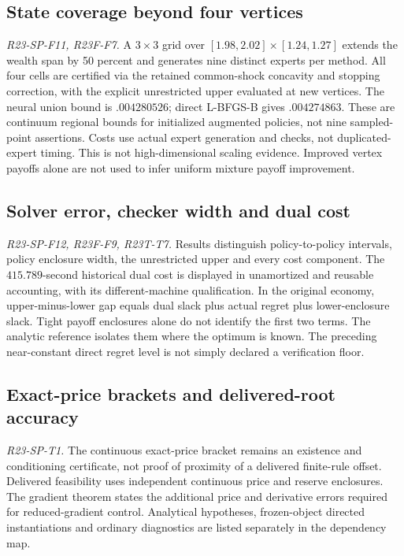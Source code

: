 \subsection{State coverage beyond four vertices}
\noindent\textit{R23-SP-F11, R23F-F7.}
A $3\times3$ grid over $[1.98,2.02]\times[1.24,1.27]$ extends the wealth span by 50 percent and generates nine distinct experts per method. All four cells are certified via the retained common-shock concavity and stopping correction, with the explicit unrestricted upper evaluated at new vertices. The neural union bound is $.004280526$; direct L-BFGS-B gives $.004274863$. These are continuum regional bounds for initialized augmented policies, not nine sampled-point assertions. Costs use actual expert generation and checks, not duplicated-expert timing. This is not high-dimensional scaling evidence. Improved vertex payoffs alone are not used to infer uniform mixture payoff improvement.

\subsection{Solver error, checker width and dual cost}
\noindent\textit{R23-SP-F12, R23F-F9, R23T-T7.}
Results distinguish policy-to-policy intervals, policy enclosure width, the unrestricted upper and every cost component. The $415.789$-second historical dual cost is displayed in unamortized and reusable accounting, with its different-machine qualification. In the original economy, upper-minus-lower gap equals dual slack plus actual regret plus lower-enclosure slack. Tight payoff enclosures alone do not identify the first two terms. The analytic reference isolates them where the optimum is known. The preceding near-constant direct regret level is not simply declared a verification floor.

\subsection{Exact-price brackets and delivered-root accuracy}
\noindent\textit{R23-SP-T1.}
The continuous exact-price bracket remains an existence and conditioning certificate, not proof of proximity of a delivered finite-rule offset. Delivered feasibility uses independent continuous price and reserve enclosures. The gradient theorem states the additional price and derivative errors required for reduced-gradient control. Analytical hypotheses, frozen-object directed instantiations and ordinary diagnostics are listed separately in the dependency map.

